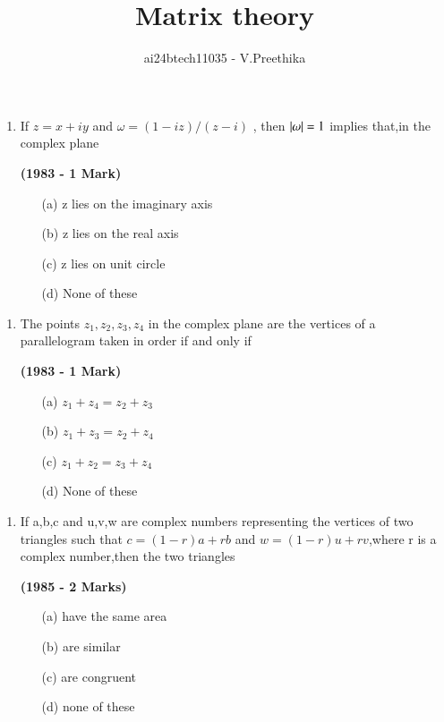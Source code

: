 \documentclass[journal,12pt,twocolumn]{IEEEtran}
\theoremstyle{remark}
\begin{document}

\vspace{3cm}

\title{Matrix theory}
\author{ai24btech11035 - V.Preethika}
\maketitle
\newpage
\bigskip

\renewcommand{\thefigure}{\theenumi}
\renewcommand{\thetable}{\theenumi}

\begin{enumerate}[start=6]
\item If $z=x+iy$ and $\omega=(1-iz)/(z-i)$ , then $\left\vert
\omega\right\vert=1$ implies that,in the complex plane

\hfill{\textbf{(1983 - 1 Mark)}}

\begin{enumerate}
\item[(a)] z lies on the imaginary axis
\item[(b)] z lies on the real axis
\item[(c)] z lies on unit circle
\item[(d)] None of these
\end{enumerate}
\end{enumerate}
\begin{enumerate}[start=7]
\item The points $z_1,z_2,z_3,z_4$ in the complex plane are the vertices of a parallelogram taken in order if and only if

\hfill{\textbf{(1983 - 1 Mark)}}

\begin{enumerate}
\item[(a)] $ z_1+z_4=z_2+z_3 $
\item[(b)] $ z_1+z_3=z_2+z_4 $
\item[(c)] $ z_1+z_2=z_3+z_4 $
\item[(d)] None of these
\end{enumerate}
\end{enumerate}
\begin{enumerate}[start=8]
\item If a,b,c and u,v,w are complex numbers representing the vertices of two triangles such that $c=(1-r)a+rb$ and $w=(1-r)u+rv$,where r is a complex number,then the two triangles

\hfill{\textbf{(1985 - 2 Marks)}}

\begin{enumerate}
\item[(a)] have the same area
\item[(b)] are similar
\item[(c)] are congruent
\item[(d)] none of these
\end{enumerate}
\end{enumerate}
\end{document}
